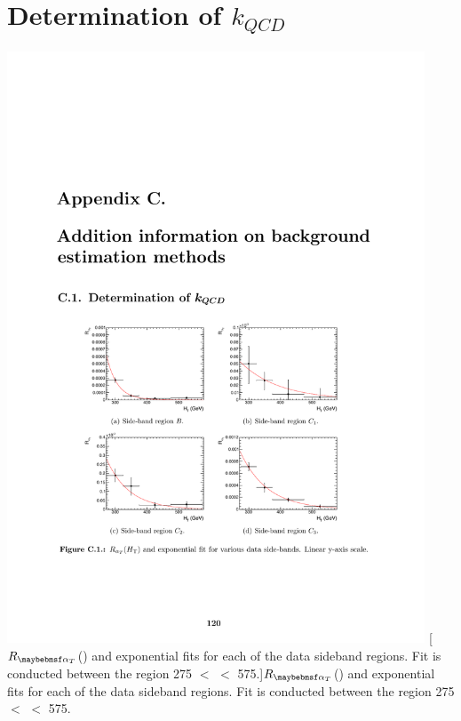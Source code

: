 \section{Determination of $k_{QCD}$}
\label{app:kqcd}


\begin{minipage}{\linewidth}
\centering
\includegraphics[width = 4.9in]{plots/qcd_sideband_fits.pdf}
[$R_{\alphat}$(\theht) and exponential fits for each of the data sideband regions. Fit is conducted between the \theht region 275 $<$ \theht $<$ 575.]{$R_{\alphat}$(\theht) and exponential fits for each of the data sideband regions. Fit is conducted between the \theht region 275 $<$ \theht $<$ 575.}
\label{fig:qcd_sideband_fits}
\end{minipage}







